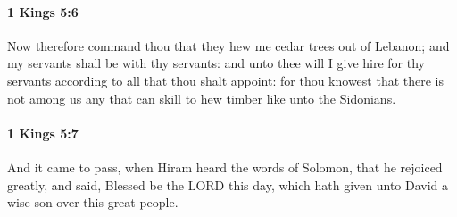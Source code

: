 		\paragraph{1 Kings 5:6} %
			\label{1KINGS-5-6}

			Now therefore command thou that they hew me cedar trees out of Lebanon; and my servants shall be with thy servants: and unto thee will I give hire for thy servants according to all that thou shalt appoint: for thou knowest that there is not among us any that can skill to hew timber like unto the Sidonians.


		\paragraph{1 Kings 5:7} %
			\label{1KINGS-5-7}

			And it came to pass, when Hiram heard the words of Solomon, that he rejoiced greatly, and said, Blessed be the LORD this day, which hath given unto David a wise son over this great people.

